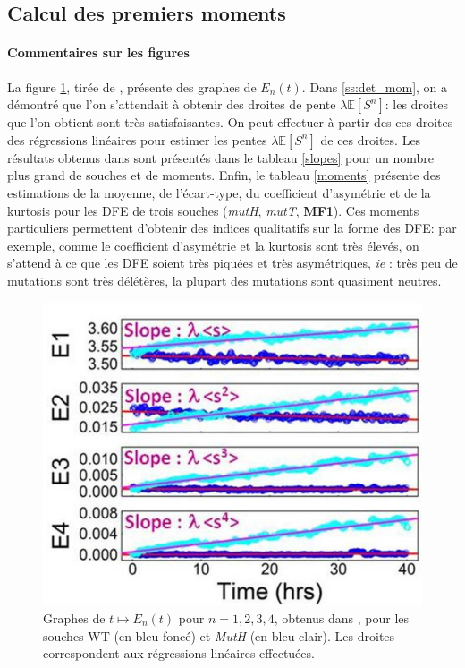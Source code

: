 \documentclass[12pt]{article}
\newcommand{\cro}[1]{\left[#1\right]}
\newcommand{\ie}{\emph{ie} }
\newcommand{\Esp}[1]{\mathbb{E}\cro{#1}}
\begin{document}
\subsection{Calcul des premiers moments}\label{ann:slopes}

\paragraph{Commentaires sur les figures} La figure \ref{lines}, tirée de \cite{rob}, présente des graphes de $E_n(t)$. Dans \ref{ss:det_mom}, on a démontré que l'on s'attendait à obtenir des droites de pente $\lambda\Esp{S^n}$: les droites que l'on obtient sont très satisfaisantes. On peut effectuer à partir des ces droites des régressions linéaires pour estimer  les pentes $\lambda\Esp{S^n}$ de ces droites. Les résultats obtenus dans \cite{rob} sont présentés dans le tableau \ref{slopes} pour un nombre plus grand de souches et de moments. Enfin, le tableau \ref{moments} présente des estimations de la moyenne, de l'écart-type, du coefficient d'asymétrie et de la kurtosis pour les DFE de trois souches (\emph{mutH}, \emph{mutT}, \textbf{MF1}). Ces moments particuliers permettent d'obtenir des indices qualitatifs sur la forme des DFE: par exemple, comme le coefficient d'asymétrie et la kurtosis sont très élevés, on s'attend à ce que les DFE soient très piquées et très asymétriques, \ie: très peu de mutations sont très délétères, la plupart des mutations sont quasiment neutres.




\begin{figure}[h]
  \begin{center}
    \includegraphics[scale=0.3]{img/supmat_lines.png}
  \end{center}
  \caption{\label{lines}Graphes de $t\mapsto E_n(t)$ pour $n=1,2,3,4$, obtenus dans \cite{rob}, pour les souches WT (en bleu foncé) et \emph{MutH} (en bleu clair). Les droites correspondent aux régressions linéaires effectuées.}
\end{figure}
\end{document}
